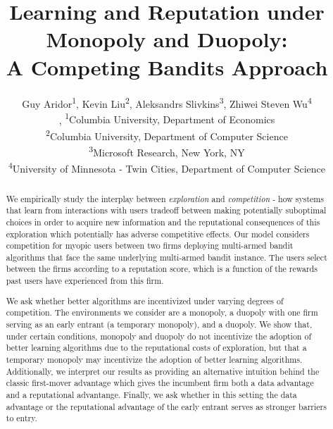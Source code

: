 \documentclass{article}
\theoremstyle{definition}
\begin{document}
\title{Learning and Reputation under Monopoly and Duopoly: \\A Competing Bandits Approach}

\author{Guy Aridor\textsuperscript{1}, Kevin Liu\textsuperscript{2}, Aleksandrs Slivkins\textsuperscript{3},
Zhiwei Steven Wu\textsuperscript{4} \\,
{\textsuperscript{1}Columbia University, Department of Economics}\\
{\textsuperscript{2}Columbia University, Department of Computer Science}\\
{\textsuperscript{3}Microsoft Research, New York, NY}\\
{\textsuperscript{4}University of Minnesota - Twin Cities, Department of Computer Science}
}
\maketitle

\begin{abstract}
We empirically study the interplay between \textit{exploration} and \textit{competition} - how systems that learn from interactions with users tradeoff between making potentially suboptimal choices in order to acquire new information and the reputational consequences of this exploration which potentially has adverse competitive effects. Our model considers competition for myopic users between two firms deploying multi-armed bandit algorithms that face the same underlying multi-armed bandit instance. The users select between the firms according to a reputation score, which is a function of the rewards past users have experienced from this firm.

We ask whether better algorithms are incentivized under varying degrees of competition. The environments we consider are a monopoly, a duopoly with one firm serving as an early entrant (a temporary monopoly), and a duopoly. We show that, under certain conditions, monopoly and duopoly do not incentivize the adoption of better learning algorithms due to the reputational costs of exploration, but that a temporary monopoly may incentivize the adoption of better learning algorithms. Additionally, we interpret our results as providing an alternative intuition behind the classic first-mover advantage which gives the incumbent firm both a data advantage and a reputational advantange. Finally, we ask whether in this setting the data advantage or the reputational advantage of the early entrant serves as stronger barriers to entry.
\end{abstract}
\end{document}
